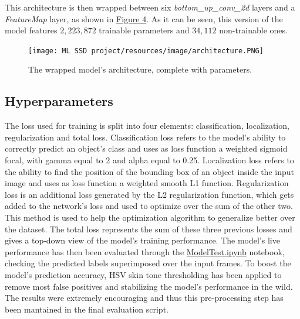 \documentclass[10pt,twocolumn,letterpaper]{article}
\begin{document}
\begin{flushleft}
This architecture is then wrapped between six \textit{bottom\_up\_conv\_2d} layers and a \textit{FeatureMap} layer, as shown in \hyperref[figure4]{Figure 4}.
As it can be seen, this version of the model features $2,223,872$ trainable parameters and $34,112$ non-trainable ones.\linebreak

\begin{figure}[!h]
    \centering
    \texttt{[image: ML SSD project/resources/image/architecture.PNG]} \caption{The wrapped model's architecture, complete with parameters.}
\end{figure}
\label{figure4}

\end{flushleft}
\subsection{Hyperparameters}
\begin{flushleft}
The loss used for training is split into four elements: classification, localization, regularization and total loss.
Classification loss refers to the model's ability to correctly predict an object's class and uses as loss function a weighted sigmoid focal, with gamma equal to 2 and alpha equal to 0.25.
Localization loss refers to the ability to find the position of the bounding box of an object inside the input image and uses as loss function a weighted smooth L1 function.
Regularization loss is an additional loss generated by the L2 regularization function, which gets added to the network's loss and used to optimize over the sum of the other two. This method is used to help the optimization algorithm to generalize better over the dataset.
The total loss represents the sum of these three previous losses and gives a top-down view of the model's training performance.\linebreak
The model's live performance has then been evaluated through the \href{https://github.com/MarzioVallero/ML-Based-Blender-Gestural-Input-Interface/blob/master/ModelTest.ipynb}{ModelTest.ipynb} notebook, checking the predicted labels superimposed over the input frames.\linebreak
To boost the model's prediction accuracy, HSV skin tone thresholding has been applied to remove most false positives and stabilizing the model's performance in the wild. The results were extremely encouraging and thus this pre-processing step has been mantained in the final evaluation script.

\end{flushleft}
\end{document}
